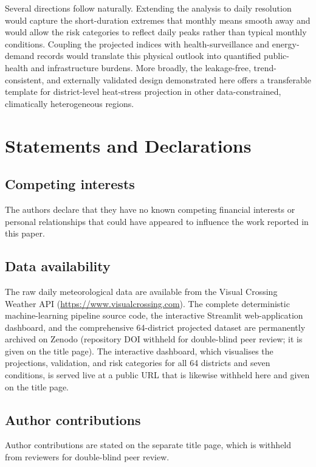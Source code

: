\documentclass[pdflatex,sn-basic,lineno]{sn-jnl}
\begin{document}
Several directions follow naturally. Extending the analysis to daily resolution
would capture the short-duration extremes that monthly means smooth away and would
allow the risk categories to reflect daily peaks rather than typical monthly
conditions. Coupling the projected indices with health-surveillance and
energy-demand records would translate this physical outlook into quantified
public-health and infrastructure burdens. More broadly, the leakage-free,
trend-consistent, and externally validated design demonstrated here offers a
transferable template for district-level heat-stress projection in other
data-constrained, climatically heterogeneous regions.



\section*{Statements and Declarations}

\subsection*{Competing interests}
The authors declare that they have no known competing financial interests or
personal relationships that could have appeared to influence the work reported in
this paper.

\subsection*{Data availability}
The raw daily meteorological data are available from the Visual Crossing Weather
API (\url{https://www.visualcrossing.com}). The complete deterministic
machine-learning pipeline source code, the interactive Streamlit web-application
dashboard, and the comprehensive 64-district projected dataset are permanently
archived on Zenodo (repository DOI withheld for double-blind peer review; it is
given on the title page). The interactive dashboard, which visualises the
projections, validation, and risk categories for all 64 districts and seven
conditions, is served live at a public URL that is likewise withheld here and
given on the title page.

\subsection*{Author contributions}
Author contributions are stated on the separate title page, which is withheld
from reviewers for double-blind peer review.
\end{document}
